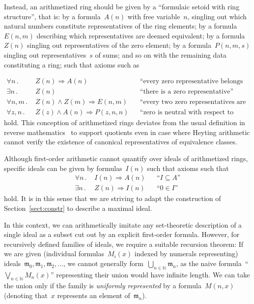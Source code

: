 \documentclass[envcountsect,envcountsame,runningheads]{llncs}
\newcommand{\mmm}{\mathfrak{m}}
\newcommand{\NN}{\mathbb{N}}
\renewcommand{\_}{\mathpunct{.}\,}
\begin{document}
Instead, an arithmetized ring should be given by a ``formulaic setoid with ring
structure'', that is: by a formula~$A(n)$ with free
variable~$n$, singling out which natural numbers constitute
representatives of the ring elements; by a formula~$E(n,m)$ describing which
representatives are deemed equivalent; by a formula~$Z(n)$ singling out
representatives of the zero element; by a formula~$P(n,m,s)$ singling out
representatives~$s$ of sums; and so on with the remaining data constituting
a ring; such that axioms such as\par
{\vspace*{-1.2em}\small\begin{align*}
  \forall n\_ & Z(n) \Rightarrow A(n) && \text{``every zero representative belongs to the ring''} \\
  \exists n\_ & Z(n) && \text{``there is a zero representative''} \\
  \forall n,m\_ & Z(n) \wedge Z(m) \Longrightarrow E(n,m) && \text{``every two zero representatives are equivalent''} \\
  \forall z,n\_ & Z(z) \wedge A(n) \Longrightarrow P(z,n,n) && \text{``zero is neutral with respect to addition''}
\end{align*}}%
hold. This conception of arithmetized rings deviates from the usual definition
in reverse mathematics~\cite[Definition~III.5.1]{simpson:subsystems} to support
quotients even in case where Heyting arithmetic cannot verify the existence of
canonical representatives of equivalence classes.

Although first-order arithmetic cannot quantify over ideals of arithmetized
rings, specific ideals can be given by formulas~$I(n)$ such that axioms such that
{\small\begin{align*}
  \forall n\_ & I(n) \Rightarrow A(n) && \text{``$I \subseteq A$''} \\
  \exists n\_ & Z(n) \Rightarrow I(n) && \text{``$0 \in I$''}
\end{align*}}%
hold. It is in this sense that we are striving to adapt the construction of
Section~\ref{sect:constr} to describe a maximal ideal.

In this context, we can arithmetically imitate any set-theoretic description of
a single ideal as a subset cut out by an explicit first-order formula. However, for
recursively defined families of ideals, we require a suitable recursion
theorem: If we are given (individual formulas~$M_i(x)$ indexed by numerals
representing) ideals~$\mmm_0,\mmm_1,\mmm_2,\ldots$, we cannot generally
form~$\bigcup_{n\in\NN} \mmm_n$, as the naive formula~``$\bigvee_{n\in\NN} M_n(x)$''
representing their union would have infinite length. We can take the union only
if the family is \emph{uniformly represented} by a formula~$M(n,x)$ (denoting
that~$x$ represents an element of~$\mmm_n$).
\end{document}
